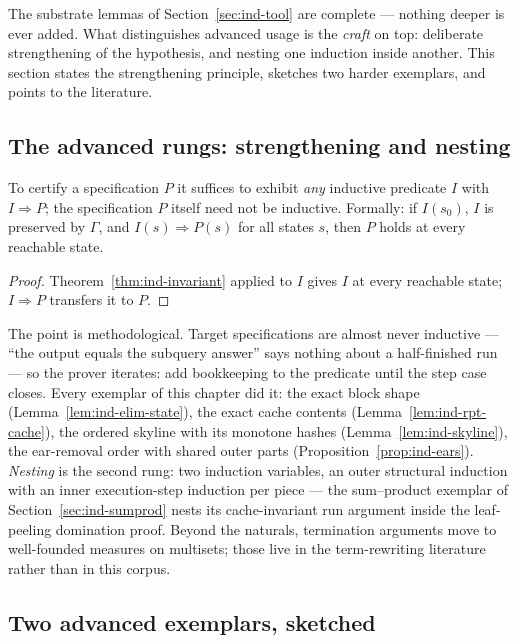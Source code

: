 The substrate lemmas of Section~\ref{sec:ind-tool} are complete --- nothing deeper is
ever added. What distinguishes advanced usage is the \emph{craft} on top: deliberate
strengthening of the hypothesis, and nesting one induction inside another. This
section states the strengthening principle, sketches two harder exemplars, and points
to the literature.

\subsection{The advanced rungs: strengthening and nesting}
\label{sec:ind-strengthening}

\begin{proposition}[Strengthening]\label{prop:ind-strengthen}
To certify a specification $P$ it suffices to exhibit \emph{any} inductive predicate
$I$ with $I \Rightarrow P$; the specification $P$ itself need not be inductive.
Formally: if $I(s_0)$, $I$ is preserved by $\Gamma$, and $I(s) \Rightarrow P(s)$ for
all states $s$, then $P$ holds at every reachable state. \eop
\end{proposition}

\begin{proof}
Theorem~\ref{thm:ind-invariant} applied to $I$ gives $I$ at every reachable state;
$I \Rightarrow P$ transfers it to $P$.
\end{proof}

The point is methodological. Target specifications are almost never inductive ---
``the output equals the subquery answer'' says nothing about a half-finished run ---
so the prover iterates: add bookkeeping to the predicate until the step case closes.
Every exemplar of this chapter did it: the exact block shape
(Lemma~\ref{lem:ind-elim-state}), the exact cache contents
(Lemma~\ref{lem:ind-rpt-cache}), the ordered skyline with its monotone hashes
(Lemma~\ref{lem:ind-skyline}), the ear-removal order with shared outer parts
(Proposition~\ref{prop:ind-ears}). \emph{Nesting} is the second rung: two induction
variables, an outer structural induction with an inner execution-step induction per
piece --- the sum--product exemplar of Section~\ref{sec:ind-sumprod} nests its
cache-invariant run argument inside the leaf-peeling domination proof. Beyond the
naturals, termination arguments move to well-founded measures on multisets; those live
in the term-rewriting literature rather than in this corpus.

\subsection{Two advanced exemplars, sketched}
\label{sec:ind-advanced-ex}

